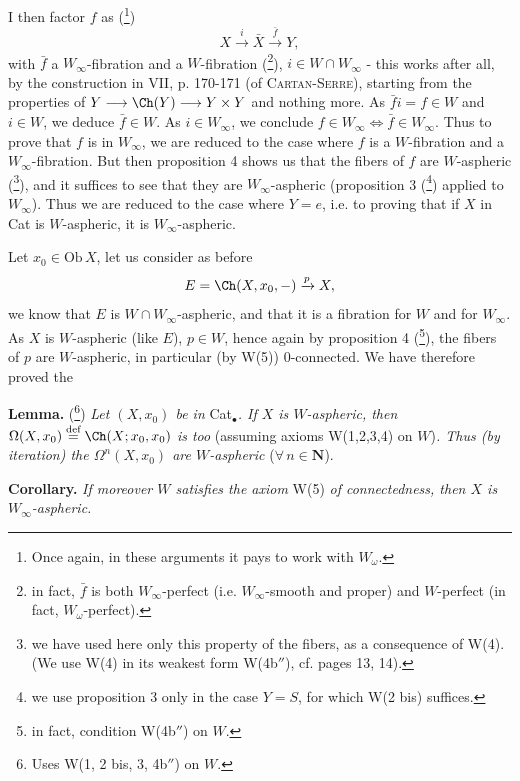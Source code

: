 I then factor $f$ as (\footnote[19]{Once again, in these arguments it pays to work with $W_\omega$.})
\[ X \xrightarrow{i} \bar{X} \xrightarrow{\bar{f}} Y, \]
with $\bar{f}$ a $W_\infty$-fibration and a $W$-fibration (\footnote[20]{in fact, $\bar{f}$ is both $W_\infty$-perfect (i.e. $W_\infty$-smooth and proper) and $W$-perfect (in fact, $W_\omega$-perfect).}), $i \in W \cap W_\infty$ - this works after all, %
by the construction in VII, p. 170-171 (of \textsc{Cartan-Serre}), starting from the properties of %
$Y \longrightarrow \Ch(Y) \longrightarrow Y \times Y$ and nothing more. As $\bar{f} i = f \in W$ and $i \in W$, we deduce $\bar{f} \in W$. As $i \in W_\infty$, we conclude $f \in W_\infty \iff \bar{f} \in W_\infty$. Thus to prove that $f$ is in $W_\infty$, we are reduced to the case where $f$ is a $W$-fibration and a $W_\infty$-fibration. But then proposition 4 shows us that the fibers of $f$ are $W$-aspheric (\footnote[21]{we have used here only this property of the fibers, as a consequence of W(4). (We use W(4) in its weakest form W(4b$''$), cf. pages 13, 14).}), and it suffices to see that they are $W_\infty$-aspheric (proposition 3 (\footnote[22]{we use proposition 3 only in the case $Y = S$, for which W(2 bis) suffices.}) applied to $W_\infty$). Thus we are reduced to the case where $Y = e$, i.e. to proving that if $X$ in Cat is $W$-aspheric, it is $W_\infty$-aspheric.

Let $x_0 \in \mathrm{Ob}\, X$, let us consider as before
\[ E = \Ch(X, x_0, -) \xrightarrow{p} X, \]
we know that $E$ is $W \cap W_\infty$-aspheric, and that it is a fibration for $W$ and for $W_\infty$. As $X$ is $W$-aspheric (like $E$), $p \in W$, hence again by proposition 4 (\footnote[23]{in fact, condition W(4b$''$) on $W$.}), the fibers of $p$ are $W$-aspheric, in particular (by W(5)) 0-connected. We have therefore proved the

\textbf{Lemma.} (\footnote[24]{Uses W(1, 2 bis, 3, 4b$''$) on $W$.}) \textit{Let $(X, x_0)$ be in} Cat$_\bullet$\textit{. If $X$ is $W$-aspheric, then $\Omega(X, x_0) \overset{\text{def}}{=} \Ch(X; x_0, x_0)$ is too} (assuming axioms W(1,2,3,4) on $W$)\textit{. Thus (by iteration) the $\Omega^n(X, x_0)$ are $W$-aspheric} ($\forall\, n \in \mathbf{N}$).

\textbf{Corollary.} \textit{If moreover $W$ satisfies the axiom} W(5) \textit{of connectedness, then $X$ is $W_\infty$-aspheric.}

